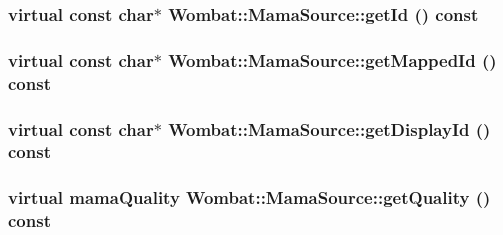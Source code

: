 \hypertarget{classWombat_1_1MamaSource_aada09147719738f93d3c1a0ce57f095b}{
\subsubsection[{getId}]{\setlength{\rightskip}{0pt plus 5cm}virtual const char$\ast$ Wombat::MamaSource::getId () const}}
\label{classWombat_1_1MamaSource_aada09147719738f93d3c1a0ce57f095b}
\hypertarget{classWombat_1_1MamaSource_a2e80dace8d0834620f2c706274a566ec}{
\subsubsection[{getMappedId}]{\setlength{\rightskip}{0pt plus 5cm}virtual const char$\ast$ Wombat::MamaSource::getMappedId () const}}
\label{classWombat_1_1MamaSource_a2e80dace8d0834620f2c706274a566ec}
\hypertarget{classWombat_1_1MamaSource_ae1571306a43aaf9cc5cfb360eefb36f4}{
\subsubsection[{getDisplayId}]{\setlength{\rightskip}{0pt plus 5cm}virtual const char$\ast$ Wombat::MamaSource::getDisplayId () const}}
\label{classWombat_1_1MamaSource_ae1571306a43aaf9cc5cfb360eefb36f4}
\hypertarget{classWombat_1_1MamaSource_a5859d625c3a226b9a4dee940504ee81e}{
\subsubsection[{getQuality}]{\setlength{\rightskip}{0pt plus 5cm}virtual mamaQuality Wombat::MamaSource::getQuality () const}}
\label{classWombat_1_1MamaSource_a5859d625c3a226b9a4dee940504ee81e}


